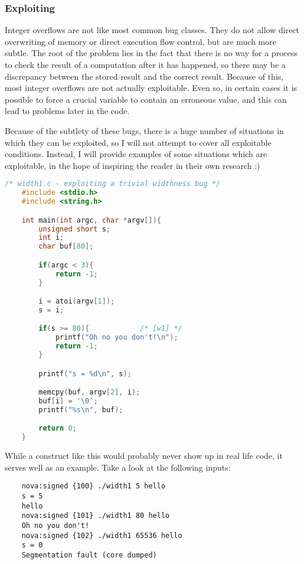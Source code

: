\documentclass{iacrtrans}
\begin{document}
\subsubsection{Exploiting}

Integer overflows are not like most common bug classes.  They do not allow
direct overwriting of memory or direct execution flow control, but are much
more subtle.  The root of the problem lies in the fact that there is no way
for a process to check the result of a computation after it has happened,
so there may be a discrepancy between the stored result and the correct
result.  Because of this, most integer overflows are not actually
exploitable.  Even so, in certain cases it is possible to force a crucial
variable to contain an erroneous value, and this can lead to problems later
in the code.

Because of the subtlety of these bugs, there is a huge number of situations
in which they can be exploited, so I will not attempt to cover all
exploitable conditions.  Instead, I will provide examples of some
situations which are exploitable, in the hope of inspiring the reader in
their own research :)


\begin{lstlisting}[language=c, caption=Example 1]
    /* width1.c - exploiting a trivial widthness bug */
    #include <stdio.h>
    #include <string.h>

    int main(int argc, char *argv[]){
        unsigned short s;
        int i;
        char buf[80];

        if(argc < 3){
            return -1;
        }

        i = atoi(argv[1]);
        s = i;

        if(s >= 80){            /* [w1] */
            printf("Oh no you don't!\n");
            return -1;
        }

        printf("s = %d\n", s);

        memcpy(buf, argv[2], i);
        buf[i] = '\0';
        printf("%s\n", buf);

        return 0;
    }
\end{lstlisting}


While a construct like this would probably never show up in real life code,
it serves well as an example.  Take a look at the following inputs:

\begin{verbatim}
    nova:signed {100} ./width1 5 hello
    s = 5
    hello
    nova:signed {101} ./width1 80 hello
    Oh no you don't!
    nova:signed {102} ./width1 65536 hello
    s = 0
    Segmentation fault (core dumped)
\end{verbatim}
\end{document}
